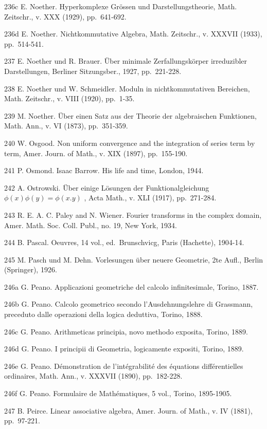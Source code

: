 236c E. Noether. Hyperkomplexe Grössen und Darstellungstheorie, Math. Zeitschr., v. XXX (1929), pp.~641-692.

236d E. Noether. Nichtkommutative Algebra, Math. Zeitschr., v. XXXVII (1933), pp.~514-541.

237 E. Noether und R. Brauer. Über minimale Zerfallungskörper irreduzibler Darstellungen, Berliner Sitzungsber., 1927, pp.~221-228.

238 E. Noether und W. Schmeidler. Moduln in nichtkommutativen Bereichen, Math. Zeitschr., v. VIII (1920), pp.~1-35.

239 M. Noether. Über einen Satz aus der Theorie der algebraischen Funktionen, Math. Ann., v. VI (1873), pp.~351-359.

240 W. Osgood. Non uniform convergence and the integration of series term by term, Amer. Journ. of Math., v. XIX (1897), pp.~155-190.

241 P. Osmond. Isaac Barrow. His life and time, London, 1944.

242 A. Ostrowski. Über einige Lösungen der Funktionalgleichung \(\phi(x)\phi(y) = \phi(x.y)\) , Acta Math., v. XLI (1917), pp.~271-284.

243 R. E. A. C. Paley and N. Wiener. Fourier transforms in the complex domain, Amer. Math. Soc. Coll. Publ., no. 19, New York, 1934.

244 B. Pascal. Oeuvres, 14 vol., ed.~Brunschvicg, Paris (Hachette), 1904-14.

245 M. Pasch und M. Dehn. Vorlesungen über neuere Geometrie, 2te Aufl., Berlin (Springer), 1926.

246a G. Peano. Applicazioni geometriche del calcolo infinitesimale, Torino, 1887.

246b G. Peano. Calcolo geometrico secondo l'Ausdehnungslehre di Grassmann, preceduto dalle operazioni della logica deduttiva, Torino, 1888.

246c G. Peano. Arithmeticas principia, novo methodo exposita, Torino, 1889.

246d G. Peano. I principii di Geometria, logicamente expositi, Torino, 1889.

246e G. Peano. Démonstration de l'intégrabilité des équations différentielles ordinaires, Math. Ann., v. XXXVII (1890), pp.~182-228.

246f G. Peano. Formulaire de Mathématiques, 5 vol., Torino, 1895-1905.

247 B. Peirce. Linear associative algebra, Amer. Journ. of Math., v. IV (1881), pp.~97-221.

